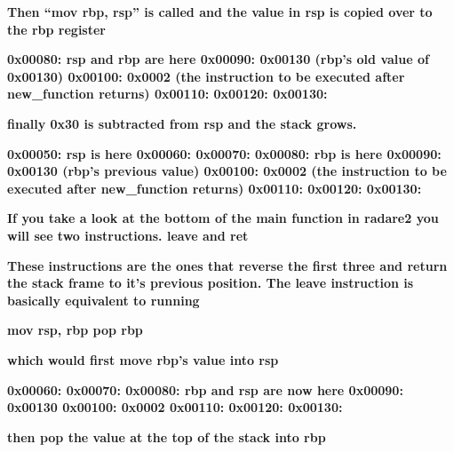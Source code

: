\textbf{Then ``mov rbp, rsp'' is called and the value in rsp is copied over to the rbp register}

\textbf{0x00080: rsp and rbp are here\newline
0x00090: 0x00130 (rbp's old value of 0x00130)\newline
0x00100: 0x0002 (the instruction to be executed after new\_function returns)\newline
0x00110:\newline
0x00120:\newline
0x00130:}

\textbf{finally 0x30 is subtracted from rsp and the stack grows.}

\textbf{0x00050: rsp is here\newline
0x00060:\newline
0x00070:\newline
0x00080: rbp is here\newline
0x00090: 0x00130 (rbp's previous value)\newline
0x00100: 0x0002 (the instruction to be executed after new\_function returns)\newline
0x00110:\newline
0x00120:\newline
0x00130:}

\textbf{If you take a look at the bottom of the main function in radare2 you will see two instructions. leave and ret}

  
 

\textbf{These instructions are the ones that reverse the first three and return the stack frame to it's previous
position. The leave instruction is basically equivalent to running}

\textbf{mov rsp, rbp\newline
pop rbp}

\textbf{which would first move rbp's value into rsp}

\textbf{0x00060:\newline
0x00070:\newline
0x00080: rbp and rsp are now here\newline
0x00090: 0x00130\newline
0x00100: 0x0002\newline
0x00110:\newline
0x00120:\newline
0x00130:}

\textbf{then pop the value at the top of the stack into rbp}

